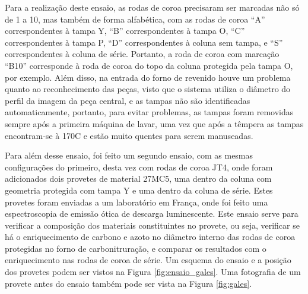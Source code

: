 \newpage
\par
Para a realização deste ensaio, as rodas de coroa precisaram ser marcadas não só de 1 a 10, mas também de forma alfabética, com as rodas de coroa “A” correspondentes à tampa Y, “B” correspondentes à tampa O, “C” correspondentes à tampa P, “D” correspondentes à coluna sem tampa, e “S” correspondentes à coluna de série. Portanto, a roda de coroa com marcação “B10” corresponde à roda de coroa do topo da coluna protegida pela tampa O, por exemplo. Além disso, na entrada do forno de revenido houve um problema quanto ao reconhecimento das peças, visto que o sistema utiliza o diâmetro do perfil da imagem da peça central, e as tampas não são identificadas automaticamente, portanto, para evitar problemas, as tampas foram removidas sempre após a primeira máquina de lavar, uma vez que após a têmpera as tampas encontram-se à 170\textdegree C e estão muito quentes para serem manuseadas.
\par
Para além desse ensaio, foi feito um segundo ensaio, com as mesmas configurações do primeiro, desta vez com rodas de coroa JT4, onde foram adicionados dois provetes de material 27MC5, uma dentro da coluna com geometria protegida com tampa Y e uma dentro da coluna de série. Estes provetes foram enviadas a um laboratório em França, onde foi feito uma espectroscopia de emissão ótica de descarga luminescente. Este ensaio serve para verificar a composição dos materiais constituintes no provete, ou seja, verificar se há o enriquecimento de carbono e azoto no diâmetro interno das rodas de coroa protegidas no forno de carbonitruração, e comparar os resultados com o enriquecimento nas rodas de coroa de série. Um esquema do ensaio e a posição dos provetes podem ser vistos na Figura \ref{fig:ensaio_gales}. Uma fotografia de um provete antes do ensaio também pode ser vista na Figura \ref{fig:gales}.
